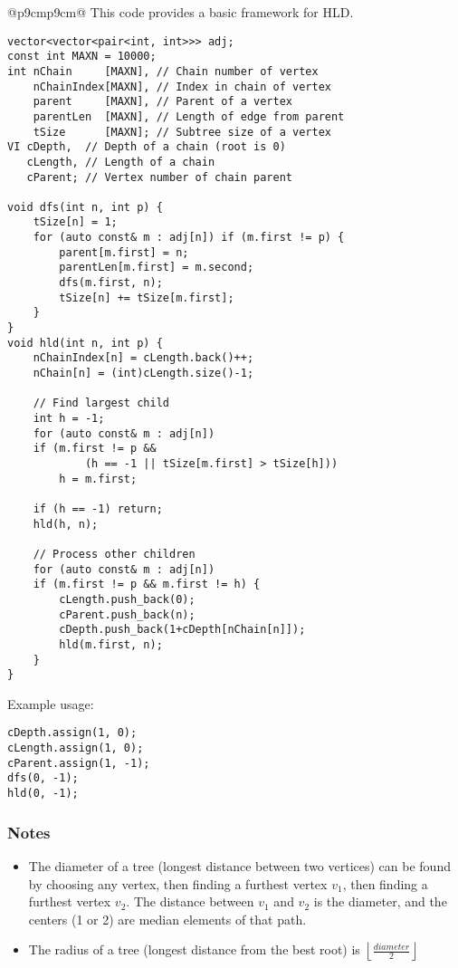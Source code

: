 \documentclass[letterpaper]{article}
\begin{document}
\begin{tabular}{@{}p{9cm}p{9cm}@{}}
This code provides a basic framework for HLD.

\begin{lstlisting}
vector<vector<pair<int, int>>> adj;
const int MAXN = 10000;
int nChain     [MAXN], // Chain number of vertex
    nChainIndex[MAXN], // Index in chain of vertex
    parent     [MAXN], // Parent of a vertex
    parentLen  [MAXN], // Length of edge from parent
    tSize      [MAXN]; // Subtree size of a vertex
VI cDepth,  // Depth of a chain (root is 0)
   cLength, // Length of a chain
   cParent; // Vertex number of chain parent

void dfs(int n, int p) {
	tSize[n] = 1;
	for (auto const& m : adj[n]) if (m.first != p) {
		parent[m.first] = n;
		parentLen[m.first] = m.second;
		dfs(m.first, n);
		tSize[n] += tSize[m.first];
	}
}
void hld(int n, int p) {
	nChainIndex[n] = cLength.back()++;
	nChain[n] = (int)cLength.size()-1;

	// Find largest child
	int h = -1;
	for (auto const& m : adj[n])
	if (m.first != p &&
			(h == -1 || tSize[m.first] > tSize[h]))
		h = m.first;

	if (h == -1) return;
	hld(h, n);

	// Process other children
	for (auto const& m : adj[n])
	if (m.first != p && m.first != h) {
		cLength.push_back(0);
		cParent.push_back(n);
		cDepth.push_back(1+cDepth[nChain[n]]);
		hld(m.first, n);
	}
}
\end{lstlisting}

Example usage:

\begin{lstlisting}
cDepth.assign(1, 0);
cLength.assign(1, 0);
cParent.assign(1, -1);
dfs(0, -1);
hld(0, -1);
\end{lstlisting}

\subsubsection{Notes}

\begin{itemize}
\item The diameter of a tree (longest distance between two vertices) can be found by choosing any vertex, then finding a furthest vertex $v_1$, then finding a furthest vertex $v_2$. The distance between $v_1$ and $v_2$ is the diameter, and the centers (1 or 2) are median elements of that path.
\item The radius of a tree (longest distance from the best root) is $\left\lfloor\frac{diameter}2\right\rfloor$
\end{itemize}
\end{tabular}
\end{document}
